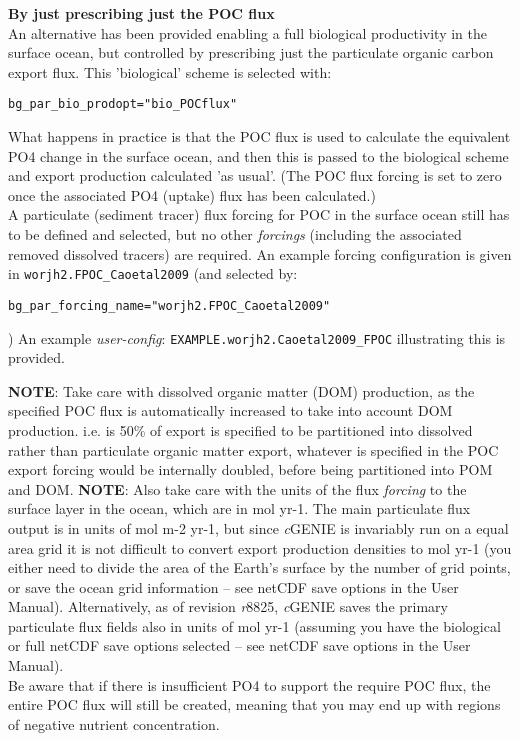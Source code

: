 \documentclass[10pt,twoside]{article}
\begin{document}
\begin{compactenum}
        \item \textbf{By just prescribing just the POC flux}
                \\An alternative has been provided enabling a full biological productivity in the surface ocean, but controlled by prescribing just the particulate organic carbon export flux. This 'biological' scheme is selected with:
\vspace{-5.5pt}\begin{verbatim}bg_par_bio_prodopt="bio_POCflux"\end{verbatim}\vspace{-5.5pt}
What happens in practice is that the POC flux is used to calculate the equivalent PO4 change in the surface ocean, and then this is passed to the biological scheme and export production calculated 'as usual'. (The POC flux forcing is set to zero once the associated PO4 (uptake) flux has been calculated.)
                \\A particulate (sediment tracer) flux forcing for POC in the surface ocean still has to be defined and selected, but no other \textit{forcings} (including the associated removed dissolved tracers) are required. An example forcing configuration is given in \texttt{worjh2.FPOC\_Caoetal2009} (and selected by:
\vspace{-5pt}\begin{verbatim}bg_par_forcing_name="worjh2.FPOC_Caoetal2009"\end{verbatim}\vspace{-5pt})
An example \textit{user-config}: \texttt{EXAMPLE.worjh2.Caoetal2009\_FPOC} illustrating this is provided.

\noindent \textbf{NOTE}: Take care with dissolved organic matter (DOM) production, as the specified POC flux is automatically increased to take into account DOM production. i.e. is 50\% of export is specified to be partitioned into dissolved rather than particulate organic matter export, whatever is specified in the POC export forcing would be internally doubled, before being partitioned into POM and DOM.
\noindent \textbf{NOTE}: Also take care with the units of the flux \textit{forcing} to the surface layer in the ocean, which are in mol yr-1. The main particulate flux output is in units of mol m-2 yr-1, but since \textit{c}GENIE is invariably run on a equal area grid it is not difficult to convert export production densities to mol yr-1 (you either need to divide the area of the Earth's surface by the number of grid points, or save the ocean grid information -- see netCDF save options in the User Manual). Alternatively, as of revision \textit{r}8825, \textit{c}GENIE saves the primary particulate flux fields also in units of mol yr-1 (assuming you have the biological or full netCDF save options selected -- see netCDF save options in the User Manual).
\\Be aware that if there is insufficient PO4 to support the require POC flux, the entire POC flux will still be created, meaning that you may end up with regions of negative nutrient concentration.

\end{compactenum}
\end{document}
